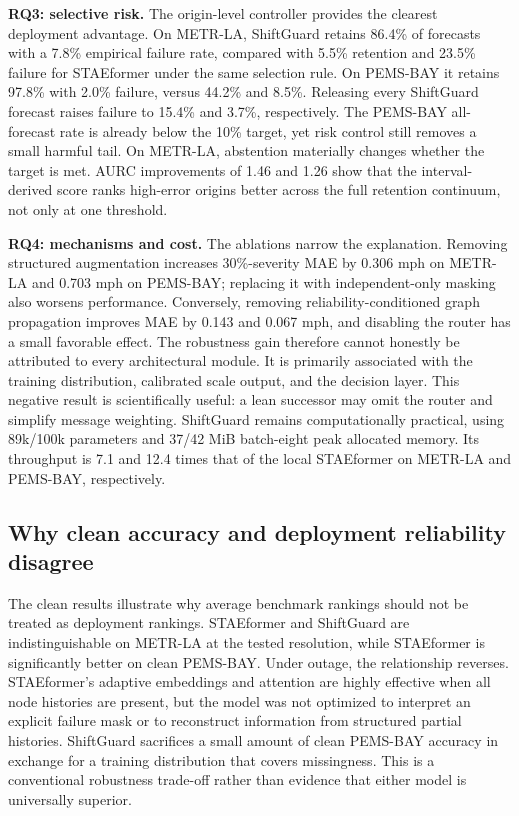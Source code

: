 \documentclass[pdflatex,sn-mathphys-num]{sn-jnl}
\begin{document}
\textbf{RQ3: selective risk.} The origin-level controller provides the clearest
deployment advantage. On METR-LA, ShiftGuard retains 86.4\% of forecasts with a
7.8\% empirical failure rate, compared with 5.5\% retention and 23.5\% failure
for STAEformer under the same selection rule. On PEMS-BAY it retains 97.8\%
with 2.0\% failure, versus 44.2\% and 8.5\%. Releasing every ShiftGuard forecast
raises failure to 15.4\% and 3.7\%, respectively. The PEMS-BAY all-forecast rate
is already below the 10\% target, yet risk control still removes a small harmful
tail. On METR-LA, abstention materially changes whether the target is met. AURC
improvements of 1.46 and 1.26 show that the interval-derived score ranks
high-error origins better across the full retention continuum, not only at one
threshold.

\textbf{RQ4: mechanisms and cost.} The ablations narrow the explanation.
Removing structured augmentation increases 30\%-severity MAE by 0.306 mph on
METR-LA and 0.703 mph on PEMS-BAY; replacing it with independent-only masking
also worsens performance. Conversely, removing reliability-conditioned graph
propagation improves MAE by 0.143 and 0.067 mph, and disabling the router has a
small favorable effect. The robustness gain therefore cannot honestly be
attributed to every architectural module. It is primarily associated with the
training distribution, calibrated scale output, and the decision layer. This
negative result is scientifically useful: a lean successor may omit the router
and simplify message weighting. ShiftGuard remains computationally practical,
using 89k/100k parameters and 37/42 MiB batch-eight peak allocated memory. Its
throughput is 7.1 and 12.4 times that of the local STAEformer on METR-LA and
PEMS-BAY, respectively.

\subsection{Why clean accuracy and deployment reliability disagree}
The clean results illustrate why average benchmark rankings should not be
treated as deployment rankings. STAEformer and ShiftGuard are indistinguishable
on METR-LA at the tested resolution, while STAEformer is significantly better
on clean PEMS-BAY. Under outage, the relationship reverses. STAEformer's
adaptive embeddings and attention are highly effective when all node histories
are present, but the model was not optimized to interpret an explicit failure
mask or to reconstruct information from structured partial histories.
ShiftGuard sacrifices a small amount of clean PEMS-BAY accuracy in exchange for
a training distribution that covers missingness. This is a conventional
robustness trade-off rather than evidence that either model is universally
superior.
\end{document}
